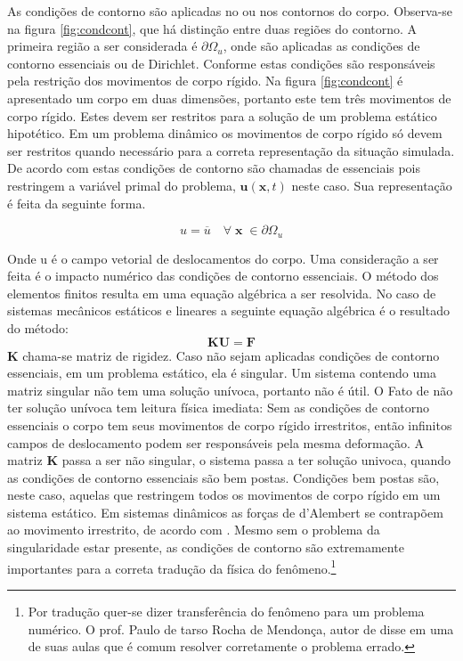 As condições de contorno são aplicadas no ou nos contornos do corpo. Observa-se na figura \ref{fig:condcont}, que há distinção entre duas regiões do contorno. A primeira região a ser considerada é $ \partial \Omega_u $, onde são aplicadas as condições de contorno essenciais ou de Dirichlet. Conforme \cite{Paulo} estas condições são responsáveis pela restrição dos movimentos de corpo rígido. Na figura \ref{fig:condcont} é apresentado um corpo em duas dimensões, portanto este tem três movimentos de corpo rígido. Estes devem ser restritos para a solução de um problema estático hipotético. Em um problema dinâmico os movimentos de corpo rígido só devem ser restritos quando necessário para a correta representação da situação simulada. De acordo com \cite{Paulo} estas condições de contorno são chamadas de essenciais pois restringem a variável primal do problema, $ \boldsymbol{u}(\boldsymbol{x},t) $ neste caso. Sua representação é feita da seguinte forma.

\begin{equation}
	u = \overline{u} \quad \forall \; \boldsymbol{x} \; \in  \partial \Omega_u
\end{equation}

Onde \gls{u} é o campo vetorial de deslocamentos do corpo. Uma consideração a ser feita é o impacto numérico das condições de contorno essenciais. O método dos elementos finitos resulta em uma equação algébrica a ser resolvida. No caso de sistemas mecânicos estáticos e lineares a seguinte equação algébrica é o resultado do método:
\begin{equation}
    \boldsymbol{K} \boldsymbol{U} = \boldsymbol{F} 
\end{equation}
$ \boldsymbol{K} $ chama-se matriz de rigidez. Caso não sejam aplicadas condições de contorno essenciais, em um problema estático, ela é singular. Um sistema contendo uma matriz singular não tem uma solução unívoca, portanto não é útil. O Fato de não ter solução unívoca tem leitura física imediata: Sem as condições de contorno essenciais o corpo tem seus movimentos de corpo rígido irrestritos, então infinitos campos de deslocamento podem ser responsáveis pela mesma deformação. A matriz $\boldsymbol{K} $ passa a ser não singular, o sistema passa a ter solução univoca, quando as condições de contorno essenciais são bem postas. Condições bem postas são, neste caso, aquelas que restringem todos os movimentos de corpo rígido em um sistema estático. Em sistemas dinâmicos as forças de d'Alembert se contrapõem ao movimento irrestrito, de acordo com \cite{Paulo}. Mesmo sem o problema da singularidade estar presente, as condições de contorno são extremamente importantes para a correta tradução da física do fenômeno.\footnote{Por tradução quer-se dizer transferência do fenômeno para um problema numérico. O prof. Paulo de tarso Rocha de Mendonça, autor de \cite{Paulo} disse em uma de suas aulas que é comum resolver corretamente o problema errado. } \\

